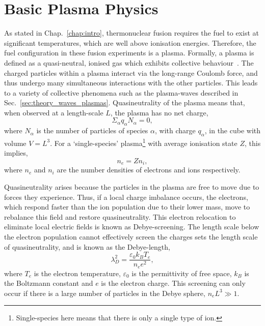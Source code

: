 \section{Basic Plasma Physics}%
\label{sec:theory_plasma_phys}

As stated in Chap.~\ref{chap:intro}, thermonuclear fusion requires the fuel to exist at significant temperatures, which are well above ionisation energies.
Therefore, the fuel configuration in these fusion experiments is a plasma.
Formally, a plasma is defined as a quasi-neutral, ionised gas which exhibits collective behaviour~\cite{chen_introduction_2018}.
The charged particles within a plasma interact via the long-range Coulomb force, and thus undergo many simultaneous interactions with the other particles.
This leads to a variety of collective phenomena such as the plasma-waves described in Sec.~\ref{sec:theory_waves_plasmas}.
Quasineutrality of the plasma means that, when observed at a length-scale $L$, the plasma has no net charge,
\begin{equation}
    \Sigma_{\alpha}q_{\alpha}N_{\alpha} = 0,
\end{equation}
where $N_{\alpha}$ is the number of particles of species $\alpha$, with charge $q_{\alpha}$, in the cube with volume $V=L^3$.
For a `single-species' plasma\footnote{Single-species here means that there is only a single type of ion.} with average ionisation state $Z$, this implies,
\begin{equation}
    n_e = Z n_i,
\end{equation}
where $n_e$ and $n_i$ are the number densities of electrons and ions respectively.

Quasineutrality arises because the particles in the plasma are free to move due to forces they experience.
Thus, if a local charge imbalance occurs, the electrons, which respond faster than the ion population due to their lower mass, move to rebalance this field and restore quasineutrality.
This electron relocation to eliminate local electric fields is known as Debye-screening.
The length scale below the electron population cannot effectively screen the charges sets the length scale of quasineutrality, and is known as the Debye-length,
\begin{equation}
    \lambda_{D}^2 = \frac{\varepsilon_0 k_B T_e}{n_e e^2},
\end{equation}
where $T_e$ is the electron temperature, $\varepsilon_0$ is the permittivity of free space, $k_B$ is the Boltzmann constant and $e$ is the electron charge.
This screening can only occur if there is a large number of particles in the Debye sphere, $n_e L^3\gg 1$.

